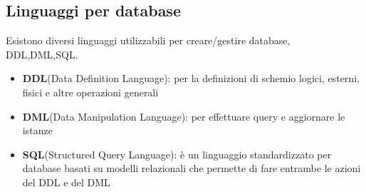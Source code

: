 \documentclass{article}
\begin{document}
    \subsection{Linguaggi per database}
        Esistono diversi linguaggi utilizzabili per creare/gestire database, DDL,DML,SQL.
        \begin{itemize}
            \item \textbf{DDL}(Data Definition Language):
            per la definizioni di schemio logici, esterni, fisici e altre operazioni generali

            \item \textbf{DML}(Data Manipulation Language):
            per effettuare query e aggiornare le istanze

            \item \textbf{SQL}(Structured Query Language):
            è un linguaggio standardizzato per database basati su modelli relazionali che permette di fare entrambe le azioni del DDL e del DML
        \end{itemize}
\end{document}
